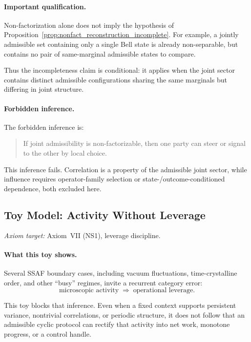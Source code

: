 \documentclass[aps,prx,onecolumn,11pt]{revtex4-2}
\theoremstyle{plain}
\theoremstyle{definition}
\theoremstyle{remark}
\begin{document}
\paragraph{Important qualification.}

Non-factorization alone does not imply the hypothesis of
Proposition~\ref{prop:nonfact_reconstruction_incomplete}. For example,
a jointly admissible set containing only a single Bell state is already
non-separable, but contains no pair of same-marginal admissible states
to compare.

Thus the incompleteness claim is conditional: it applies when the joint
sector contains distinct admissible configurations sharing the same
marginals but differing in joint structure.

\paragraph{Forbidden inference.}

The forbidden inference is:
\begin{quote}
If joint admissibility is non-factorizable, then one party can steer or
signal to the other by local choice.
\end{quote}

This inference fails. Correlation is a property of the admissible joint
sector, while influence requires operator-family selection or
state-/outcome-conditioned dependence, both excluded here.

\subsection{Toy Model: Activity Without Leverage}
\label{toy:activity_without_leverage}

\noindent\emph{Axiom target:} Axiom~VII (NS1), leverage discipline.

\paragraph{What this toy shows.}

Several SSAF boundary cases, including vacuum fluctuations,
time-crystalline order, and other ``busy'' regimes, invite a recurrent
category error:
\[
\text{microscopic activity}
\;\Longrightarrow\;
\text{operational leverage}.
\]

This toy blocks that inference. Even when a fixed context supports
persistent variance, nontrivial correlations, or periodic structure, it
does not follow that an admissible cyclic protocol can rectify that
activity into net work, monotone progress, or a control handle.
\end{document}
